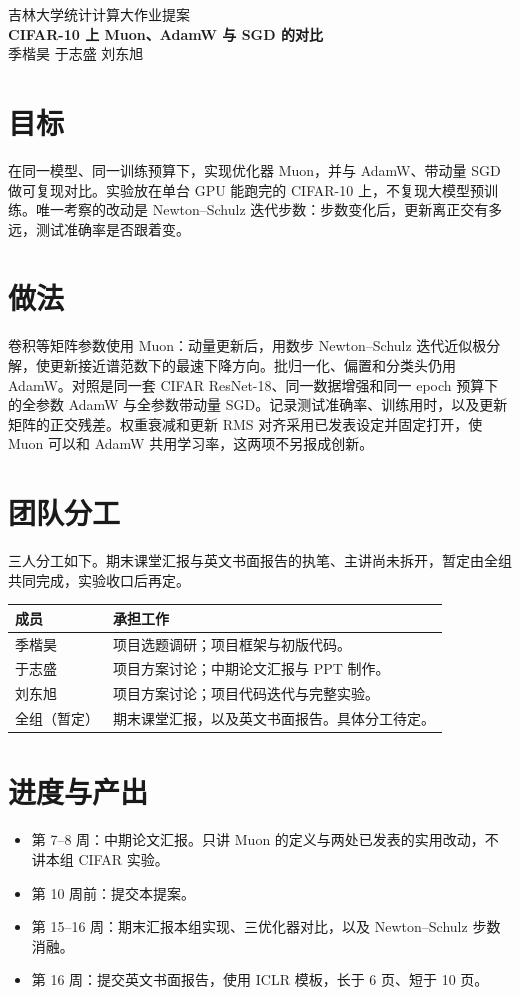 \documentclass[UTF8,a4paper,12pt]{ctexart}
\begin{document}
\begin{center}
  {\small\color{muted} 吉林大学\quad 统计计算\quad 大作业提案}\\[0.55em]
  {\LARGE\bfseries CIFAR-10 上 Muon、AdamW 与 SGD 的对比}\\[0.55em]
  {\normalsize 季楷昊 \quad 于志盛 \quad 刘东旭}
\end{center}
\vspace{-0.15em}
\noindent{\color{rule}\rule{\linewidth}{0.8pt}}

\section{目标}
在同一模型、同一训练预算下，实现优化器 Muon，并与 AdamW、带动量 SGD 做可复现对比。实验放在单台 GPU 能跑完的 CIFAR-10 上，不复现大模型预训练。唯一考察的改动是 Newton--Schulz 迭代步数：步数变化后，更新离正交有多远，测试准确率是否跟着变。

\section{做法}
卷积等矩阵参数使用 Muon：动量更新后，用数步 Newton--Schulz 迭代近似极分解，使更新接近谱范数下的最速下降方向。批归一化、偏置和分类头仍用 AdamW。对照是同一套 CIFAR ResNet-18、同一数据增强和同一 epoch 预算下的全参数 AdamW 与全参数带动量 SGD。记录测试准确率、训练用时，以及更新矩阵的正交残差。权重衰减和更新 RMS 对齐采用已发表设定并固定打开，使 Muon 可以和 AdamW 共用学习率，这两项不另报成创新。

\section{团队分工}
三人分工如下。期末课堂汇报与英文书面报告的执笔、主讲尚未拆开，暂定由全组共同完成，实验收口后再定。

\vspace{0.45em}
{\renewcommand{\arraystretch}{1.42}
\noindent\begin{tabularx}{\linewidth}{@{}p{2.8cm} Y@{}}
  \toprule
  \textbf{成员} & \textbf{承担工作} \\
  \midrule
  季楷昊 & 项目选题调研；项目框架与初版代码。 \\
  于志盛 & 项目方案讨论；中期论文汇报与 PPT 制作。 \\
  刘东旭 & 项目方案讨论；项目代码迭代与完整实验。 \\
  全组（暂定） & 期末课堂汇报，以及英文书面报告。具体分工待定。 \\
  \bottomrule
\end{tabularx}}

\section{进度与产出}
\begin{itemize}
  \item 第 7--8 周：中期论文汇报。只讲 Muon 的定义与两处已发表的实用改动，不讲本组 CIFAR 实验。
  \item 第 10 周前：提交本提案。
  \item 第 15--16 周：期末汇报本组实现、三优化器对比，以及 Newton--Schulz 步数消融。
  \item 第 16 周：提交英文书面报告，使用 ICLR 模板，长于 6 页、短于 10 页。
\end{itemize}
\end{document}
